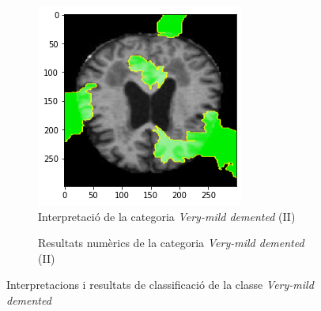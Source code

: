 \documentclass[a4paper,12pt]{report}
\begin{document}
\begin{figure}[h!]
    \begin{subfigure}[b]{0.40\linewidth}
        \includegraphics[width=\linewidth]{images/Very mild 2.png}
        \caption{Interpretació de la categoria \textit{Very-mild demented} (II)}
        \label{fig:VMD2}
    \end{subfigure}
    \begin{subfigure}[b]{0.40\linewidth}
        \caption{Resultats numèrics de la categoria \textit{Very-mild demented} (II)}
        \label{fig:ClassificacioVMD1}
    \end{subfigure}
    \caption{Interpretacions i resultats de classificació de la classe \textit{Very-mild demented}}
    \label{fig:VMDInterpretacions}
\end{figure}
\end{document}
